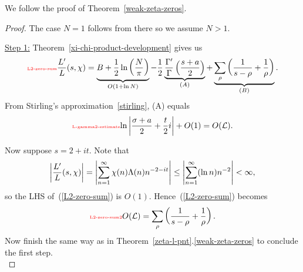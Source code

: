 We follow the proof of Theorem~\ref{weak-zeta-zeros}. 
\begin{proof}
The case $N=1$ follows from there so we assume $N>1$. 

\noindent\underline{Step 1:}
Theorem~\ref{xi-chi-product-development} gives us
\begin{equation}\llabel{L2-zero-sum}
\frac{L'}{L}(s,\chi)=
\underbrace{B+\rc2\ln\pf{N}{\pi}}_{O(1+\ln N)}
-
\rc2\underbrace{\frac{\Ga'}{\Ga}\pa{
\frac {s+a}2}}_{(A)}+
\underbrace{\sum_{\rh} \pa{\rc{
s-\rh}+\rc{\rh}}}_{(B)}.
\end{equation}
From Stirling's approximation~\ref{stirling}, (A) equals
\begin{equation}\llabel{L-gamma2-estimate}
{\ln\ab{\frac{\si+a}{2}+\frac t2i}}%
+O(1)=O(\cal L).
\end{equation}

Now suppose $s=2+it$. 
Note that
\[
\left| {\frac{L'}{L}(s,\chi)} \right|
=\left| {\sum_{n=1}^{\infty} \chi(n)\Lambda(n)n^{-2-it}} \right|
\le \left| {\sum_{n=1}^{\infty} (\ln n)n^{-2}} \right|<\infty,
\]
so the LHS of~(\ref{L2-zero-sum}) is $O(1)$.
Hence~(\ref{L2-zero-sum}) becomes
\begin{equation}\llabel{L2-zero-sum2}
O(\cal L)=\sum_{\rh} \pa{\rc{
s-\rh}+\rc{\rh}}.
\end{equation}
Now finish the same way as in Theorem~\ref{zeta-l-pnt}.\ref{weak-zeta-zeros} to conclude the first step.\\


\end{proof}

